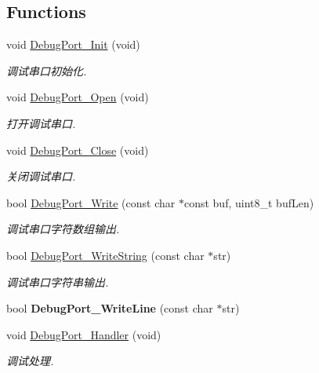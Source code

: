 \subsection*{Functions}
\begin{DoxyCompactItemize}
\item 
void \hyperlink{group___debug_port_gac8b6f2276832297b953b0df9c9b9c94f}{Debug\+Port\+\_\+\+Init} (void)
\begin{DoxyCompactList}\small\item\em 调试串口初始化. \end{DoxyCompactList}\item 
void \hyperlink{group___debug_port_gaf512b658a5c59c2cf06838a46fb566a6}{Debug\+Port\+\_\+\+Open} (void)
\begin{DoxyCompactList}\small\item\em 打开调试串口. \end{DoxyCompactList}\item 
void \hyperlink{group___debug_port_ga91e73a4824db7761c9fa3eb56307a349}{Debug\+Port\+\_\+\+Close} (void)
\begin{DoxyCompactList}\small\item\em 关闭调试串口. \end{DoxyCompactList}\item 
bool \hyperlink{group___debug_port_ga47bfe409c836aac8085b37893f18a76e}{Debug\+Port\+\_\+\+Write} (const char $\ast$const buf, uint8\+\_\+t buf\+Len)
\begin{DoxyCompactList}\small\item\em 调试串口字符数组输出. \end{DoxyCompactList}\item 
bool \hyperlink{group___debug_port_gac47fcdcebb69fc3d0a25406f022b3092}{Debug\+Port\+\_\+\+Write\+String} (const char $\ast$str)
\begin{DoxyCompactList}\small\item\em 调试串口字符串输出. \end{DoxyCompactList}\item 
\mbox{\label{group___debug_port_gab8d8141626dcee601e04f367ad83919c}} 
bool {\bfseries Debug\+Port\+\_\+\+Write\+Line} (const char $\ast$str)
\item 
void \hyperlink{group___debug_port_ga8c0e9f2cebd2a8d98f836c9cf85d6d18}{Debug\+Port\+\_\+\+Handler} (void)
\begin{DoxyCompactList}\small\item\em 调试处理. \end{DoxyCompactList}\item 

\end{DoxyCompactItemize}
